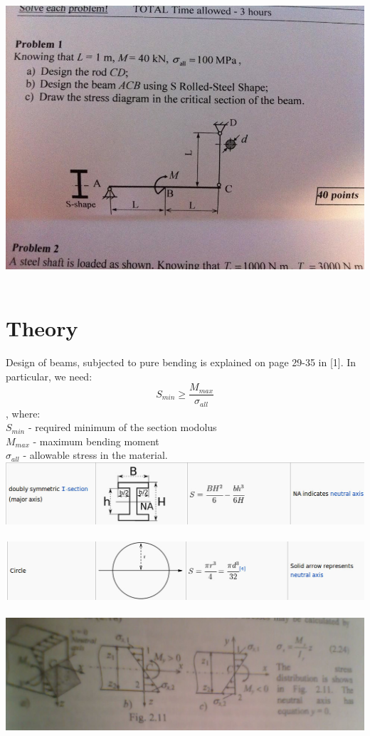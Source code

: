 \documentclass{article}
\begin{document}
\includegraphics[width=1\textwidth]{images/problem}~

\section{Theory}
Design of beams, subjected to pure bending is explained on page 29-35 in [1].
In particular, we need: \\
$$ S_{min} \geq \frac{M_{max}}{\sigma_{all}} $$
, where: \\
$S_{min}$ - required minimum of the section modolus \\
$M_{max}$ - maximum bending moment \\
$\sigma_{all}$ - allowable stress in the material.
\\
\includegraphics[width=1\textwidth]{images/modulus}~
\\
\includegraphics[width=1\textwidth]{images/circle-modulus}~
\\
\includegraphics[width=1\textwidth]{images/y-stress}~
\\
\end{document}
